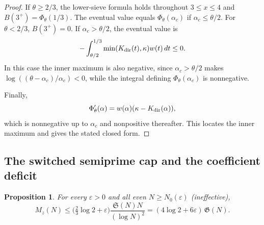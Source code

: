 \documentclass[final,11pt]{elsarticle}
\newtheorem{proposition}[theorem]{Proposition}
\theoremstyle{definition}
\theoremstyle{remark}
\newcommand{\Sg}{\mathfrak{S}}
\newcommand{\GG}{\mathfrak{G}}
\newcommand{\eps}{\varepsilon}
\numberwithin{equation}{section}
\begin{document}
\begin{proof}
If $\theta\ge2/3$, the lower-sieve formula holds throughout
$3\le x\le4$ and $B(3^+)=\Phi_\theta(1/3)$.
The eventual value equals $\Phi_\theta(\alpha_c)$ if
$\alpha_c\le\theta/2$. For $\theta<2/3$,
$B(3^+)=0$. If $\alpha_c>\theta/2$, the eventual value is
\[
 -\int_{\theta/2}^{1/3}\min(K_{\rm dir}(t),\kappa)w(t)\,dt\le0.
\]
In this case the inner maximum is also negative, since
$\alpha_c>\theta/2$ makes
$\log((\theta-\alpha_c)/\alpha_c)<0$, while the
integral defining $\Phi_\theta(\alpha_c)$ is nonnegative.

Finally,
\[
 \Phi_\theta'(\alpha)
  =w(\alpha)(\kappa-K_{\rm dir}(\alpha)),
\]
which is nonnegative up to $\alpha_c$ and nonpositive
thereafter. This locates the inner maximum and gives the stated
closed form.\qedhere
\end{proof}

\subsection{The switched semiprime cap and the coefficient deficit}

\begin{proposition}\label{prop:switched-cap}
For every $\eps>0$ and all even $N\ge N_0(\eps)$ (ineffective),
\[
M_z(N)\le\bigl(\tfrac23\log2+\eps\bigr)\frac{\Sg(N)N}{(\log N)^2}=(4\log2+6\eps)\,\GG(N).
\]
\end{proposition}
\end{document}
